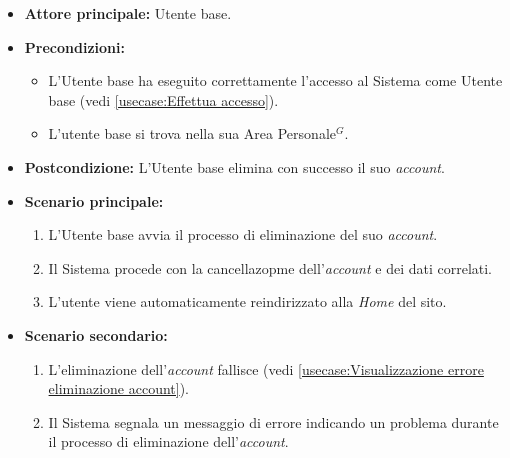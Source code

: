 \label{usecase:Eliminazione account}
\begin{itemize}
	\item \textbf{Attore principale:} Utente base.

	\item \textbf{Precondizioni:}
	      \begin{itemize}
		      \item L'Utente base ha eseguito correttamente l'accesso al Sistema come Utente base (vedi \autoref{usecase:Effettua accesso}).
		      \item L'utente base si trova nella sua Area Personale$^G$.
	      \end{itemize}

	\item \textbf{Postcondizione:} L'Utente base elimina con successo il suo \textit{account}.

	\item \textbf{Scenario principale:}
	      \begin{enumerate}
		      \item L'Utente base avvia il processo di eliminazione del suo \textit{account}.
		      \item Il Sistema procede con la cancellazopme dell'\textit{account} e dei dati correlati.
		      \item L'utente viene automaticamente reindirizzato alla \textit{Home} del sito.
	      \end{enumerate}
	\item \textbf{Scenario secondario:}
	      \begin{enumerate}
		      \item L'eliminazione dell'\textit{account} fallisce (vedi \autoref{usecase:Visualizzazione errore eliminazione account}).
		      \item Il Sistema segnala un messaggio di errore indicando un problema durante il processo di eliminazione dell'\textit{account}.
	      \end{enumerate}
\end{itemize}

